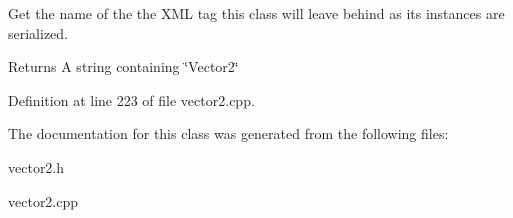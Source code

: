 Get the name of the the XML tag this class will leave behind as its instances are serialized. 

\begin{DoxyReturn}{Returns}
A string containing \char`\"{}Vector2\char`\"{} 
\end{DoxyReturn}


Definition at line 223 of file vector2.cpp.



The documentation for this class was generated from the following files:\begin{DoxyCompactItemize}
\item 
vector2.h\item 
vector2.cpp\end{DoxyCompactItemize}

